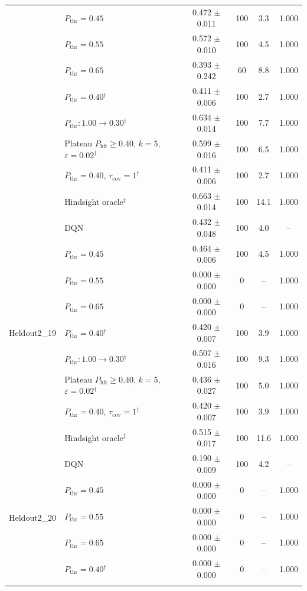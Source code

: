 \begin{table}[htbp]
\begin{tabular}{llcccc}
 & $P_{\mathrm{thr}}=0.45$ & 0.472 $\pm$ 0.011 & 100 & 3.3 & 1.000 \\
 & $P_{\mathrm{thr}}=0.55$ & 0.572 $\pm$ 0.010 & 100 & 4.5 & 1.000 \\
 & $P_{\mathrm{thr}}=0.65$ & 0.393 $\pm$ 0.242 & 60 & 8.8 & 1.000 \\
 & $P_{\mathrm{thr}}=0.40$$^{\dagger}$ & 0.411 $\pm$ 0.006 & 100 & 2.7 & 1.000 \\
 & $P_{\mathrm{thr}}: 1.00 \to 0.30$$^{\dagger}$ & 0.634 $\pm$ 0.014 & 100 & 7.7 & 1.000 \\
 & Plateau $P_{\mathrm{hit}}\geq0.40$, $k=5$, $\varepsilon=0.02$$^{\dagger}$ & 0.599 $\pm$ 0.016 & 100 & 6.5 & 1.000 \\
 & $P_{\mathrm{thr}}=0.40$, $\tau_{\mathrm{cov}}=1$$^{\dagger}$ & 0.411 $\pm$ 0.006 & 100 & 2.7 & 1.000 \\
 & Hindsight oracle$^{\ddagger}$ & 0.663 $\pm$ 0.014 & 100 & 14.1 & 1.000 \\
\midrule
\multirow{9}{*}{Heldout2\_19} & DQN & 0.432 $\pm$ 0.048 & 100 & 4.0 & -- \\
 & $P_{\mathrm{thr}}=0.45$ & 0.464 $\pm$ 0.006 & 100 & 4.5 & 1.000 \\
 & $P_{\mathrm{thr}}=0.55$ & 0.000 $\pm$ 0.000 & 0 & -- & 1.000 \\
 & $P_{\mathrm{thr}}=0.65$ & 0.000 $\pm$ 0.000 & 0 & -- & 1.000 \\
 & $P_{\mathrm{thr}}=0.40$$^{\dagger}$ & 0.420 $\pm$ 0.007 & 100 & 3.9 & 1.000 \\
 & $P_{\mathrm{thr}}: 1.00 \to 0.30$$^{\dagger}$ & 0.507 $\pm$ 0.016 & 100 & 9.3 & 1.000 \\
 & Plateau $P_{\mathrm{hit}}\geq0.40$, $k=5$, $\varepsilon=0.02$$^{\dagger}$ & 0.436 $\pm$ 0.027 & 100 & 5.0 & 1.000 \\
 & $P_{\mathrm{thr}}=0.40$, $\tau_{\mathrm{cov}}=1$$^{\dagger}$ & 0.420 $\pm$ 0.007 & 100 & 3.9 & 1.000 \\
 & Hindsight oracle$^{\ddagger}$ & 0.515 $\pm$ 0.017 & 100 & 11.6 & 1.000 \\
\midrule
\multirow{9}{*}{Heldout2\_20} & DQN & 0.190 $\pm$ 0.009 & 100 & 4.2 & -- \\
 & $P_{\mathrm{thr}}=0.45$ & 0.000 $\pm$ 0.000 & 0 & -- & 1.000 \\
 & $P_{\mathrm{thr}}=0.55$ & 0.000 $\pm$ 0.000 & 0 & -- & 1.000 \\
 & $P_{\mathrm{thr}}=0.65$ & 0.000 $\pm$ 0.000 & 0 & -- & 1.000 \\
 & $P_{\mathrm{thr}}=0.40$$^{\dagger}$ & 0.000 $\pm$ 0.000 & 0 & -- & 1.000 \\
$$
\end{tabular}
\end{table}
